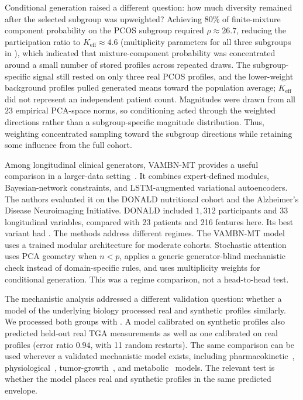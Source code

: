 Conditional generation raised a different question: how much diversity remained after the
selected subgroup was upweighted? Achieving
80\% of finite-mixture component probability on the PCOS subgroup required
$\rho \approx 26.7$, reducing the participation ratio to
$K_{\text{eff}} \approx 4.6$ (multiplicity parameters
for all three subgroups in ),
which indicated that mixture-component probability was concentrated around a small number
of stored profiles across repeated draws. The subgroup-specific signal still rested on only
three real PCOS profiles, and the lower-weight background profiles pulled generated means
toward the population average; $K_{\text{eff}}$ did not represent an independent patient
count. Magnitudes were drawn from all $23$ empirical PCA-space norms, so conditioning acted
through the weighted directions rather than a subgroup-specific magnitude distribution.
Thus, weighting concentrated sampling toward the subgroup directions while retaining some
influence from the full cohort.

Among longitudinal clinical generators, VAMBN-MT provides a useful comparison in a
larger-data setting~\citep{Kuhnel2024}. It combines
expert-defined modules, Bayesian-network constraints, and LSTM-augmented variational
autoencoders. The authors evaluated it on the DONALD nutritional cohort and the Alzheimer's
Disease Neuroimaging Initiative. DONALD included $1{,}312$ participants and 33 longitudinal
variables, compared with 23 patients and 216 features here. Its best variant had . The methods address different regimes. The VAMBN-MT model uses a trained modular architecture
for moderate cohorts. Stochastic attention uses PCA geometry when $n<p$, applies a generic
generator-blind mechanistic check instead of domain-specific rules, and uses multiplicity
weights for conditional generation. This was a regime comparison, not a head-to-head test.

The mechanistic analysis addressed a different validation question: whether a model of the
underlying biology processed real and synthetic profiles similarly. We processed both groups
with . A model calibrated on synthetic profiles also
predicted held-out real TGA measurements as well as one calibrated on real profiles (error
ratio $0.94$, with 11 random restarts). The same comparison can be used wherever a validated
mechanistic model exists, including pharmacokinetic~\citep{MouldUpton2013},
physiological~\citep{Chase2011}, tumor-growth~\citep{Ribba2012}, and
metabolic~\citep{Yizhak2015,Shan2018} models. The relevant test is whether the model places
real and synthetic profiles in the same predicted envelope.


